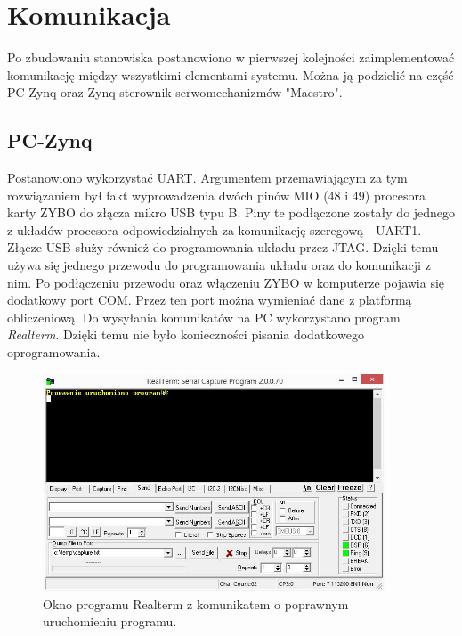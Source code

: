 \chapter{Komunikacja}
\label{cha:komunikacja}

Po zbudowaniu stanowiska postanowiono w pierwszej kolejności zaimplementować komunikację między wszystkimi elementami systemu. 
Można ją podzielić na część PC-Zynq oraz Zynq-sterownik serwomechanizmów "Maestro".

\section{PC-Zynq}
\label{sec:pc-zynq}
Postanowiono wykorzystać UART. 
Argumentem przemawiającym za tym rozwiązaniem był fakt wyprowadzenia dwóch pinów MIO (48 i 49) procesora karty ZYBO do złącza mikro USB typu B. 
Piny te podłączone zostały do jednego z układów procesora odpowiedzialnych za komunikację szeregową - UART1. 
Złącze USB służy również do programowania układu przez JTAG.
Dzięki temu używa się jednego przewodu do programowania układu oraz do komunikacji z nim. 
Po podłączeniu przewodu oraz włączeniu ZYBO w komputerze pojawia się dodatkowy port COM. 
Przez ten port można wymieniać dane z platformą obliczeniową. Do wysyłania komunikatów na PC wykorzystano program \textit{Realterm}. 
Dzięki temu nie było konieczności pisania dodatkowego oprogramowania.

\begin{figure}[h]
	\centering
	\includegraphics[width=4in]{realterm.jpg}
	\caption{Okno programu Realterm z komunikatem o poprawnym uruchomieniu programu.}
\end{figure}

